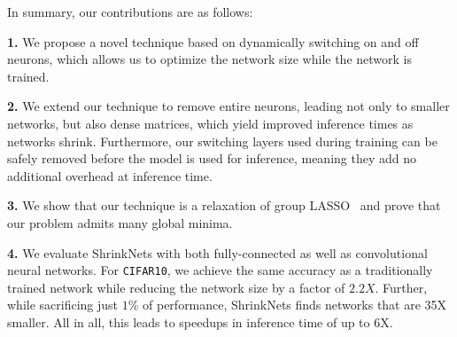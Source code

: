 In summary, our contributions are as follows: 


\noindent\textbf{1.} We propose a novel technique based on dynamically switching
on and off neurons, which allows us to optimize the network size while the
network is trained. 

\noindent\textbf{2.} We extend our technique to remove entire neurons,
 leading not only to smaller networks, but also
dense matrices, which yield improved inference times as networks shrink. Furthermore, our switching
layers used during training can be safely removed before the model is used for
inference, meaning they add no additional overhead at inference time.


\noindent\textbf{3.} We show that our technique is a relaxation of group
LASSO~\cite{Yuan2006} and prove that our problem admits many global minima.

\noindent\textbf{4.} We evaluate ShrinkNets with both fully-connected as well as
convolutional neural networks. For \texttt{CIFAR10}, we achieve the same
accuracy as a traditionally trained network while reducing the network size by
a factor of $2.2X$. Further, while sacrificing just $1$\% of
performance, ShrinkNets finds networks that are 35X smaller. All in all, this
leads to speedups in inference time of up to 6X. 



